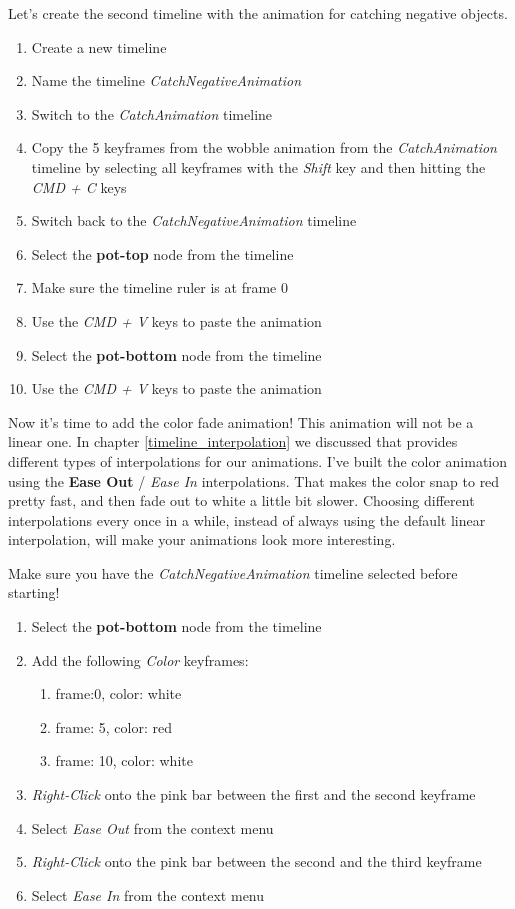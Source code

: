 \begin{leftbar}
Let's create the second timeline with the animation for catching negative
objects.
\begin{enumerate}
  \item Create a new timeline
  \item Name the timeline \textit{CatchNegativeAnimation}
  \item Switch to the \textit{CatchAnimation} timeline
  \item Copy the 5 keyframes from the wobble animation from the
  \textit{CatchAnimation} timeline by selecting all keyframes with the
  \textit{Shift} key and then hitting the \textit{CMD + C} keys
  \item Switch back to the \textit{CatchNegativeAnimation} timeline
  \item Select the \textbf{pot-top} node from the timeline
  \item Make sure the timeline ruler is at frame 0
  \item Use the \textit{CMD + V} keys to paste the animation
  \item Select the \textbf{pot-bottom} node from the timeline
  \item Use the \textit{CMD + V} keys to paste the animation
\end{enumerate}
\end{leftbar}

Now it's time to add the color fade animation! This animation will not be a
linear one. In chapter \ref{timeline_interpolation} we discussed that \cocos{}
provides different types of interpolations for our animations. I've built the
color animation using the \textbf{Ease Out} / \textit{Ease In} interpolations.
That makes the color snap to red pretty fast, and then fade out to white a
little bit slower. Choosing different interpolations every once in a while,
instead of always using the default linear interpolation, will make your
animations look more interesting.

\begin{leftbar}
Make sure you have the \textit{CatchNegativeAnimation} timeline selected before
starting!
\begin{enumerate}
  \item Select the \textbf{pot-bottom} node from the timeline
  \item Add the following \textit{Color} keyframes:
  \begin{enumerate}
    \item frame:0, color: white
    \item frame: 5, color: red
    \item frame: 10, color: white 
  \end{enumerate}
  \item \textit{Right-Click} onto the pink bar between the first and the second
  keyframe
  \item Select \textit{Ease Out} from the context menu
  \item \textit{Right-Click} onto the pink bar between the second and the third
  keyframe
  \item Select \textit{Ease In} from the context menu
\end{enumerate}
\end{leftbar}

